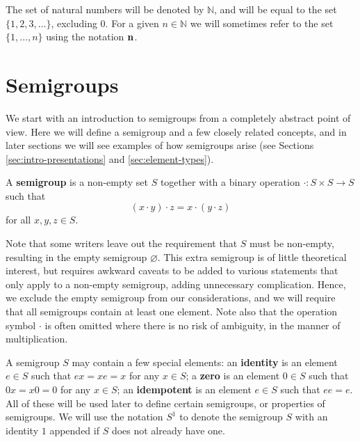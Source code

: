 The set of natural numbers will be denoted by $\mathbb{N}$, and will be equal to
the set $\{1, 2, 3, \ldots\}$, excluding $0$.  For a given $n \in \mathbb{N}$ we
will sometimes refer to the set $\{1, \ldots, n\}$ using the notation $\mathbf{n}$.

\section{Semigroups}
\label{sec:intro-semigroups}
We start with an introduction to semigroups from a completely abstract point of
view.  Here we will define a semigroup and a few closely related concepts, and
in later sections we will see examples of how semigroups arise (see Sections
\ref{sec:intro-presentations} and \ref{sec:element-types}).

\begin{definition}
  \label{def:semigroup}
  A \textbf{semigroup} is a non-empty set $S$ together with
  a binary operation $\cdot: S \times S \to S$ such that
  $$(x \cdot y) \cdot z = x \cdot (y \cdot z)$$
  for all $x, y, z \in S$.
\end{definition}
Note that some writers leave out the requirement that $S$ must be non-empty,
resulting in the empty semigroup $\varnothing$.  This extra semigroup is of
little theoretical interest, but requires awkward caveats to be added to various
statements that only apply to a non-empty semigroup, adding unnecessary
complication.  Hence, we exclude the empty semigroup from our considerations,
and we will require that all semigroups contain at least one element.  Note also
that the operation symbol $\cdot$ is often omitted where there is no risk of
ambiguity, in the manner of multiplication.

A semigroup $S$ may contain a few special elements: an \textbf{identity} is an
element $e \in S$ such that $ex = xe = x$ for any $x \in S$; a \textbf{zero} is
an element $0 \in S$ such that $0x = x0 = 0$ for any $x \in S$; an
\textbf{idempotent} is an element $e \in S$ such that $ee=e$.  All of these will
be used later to define certain semigroups, or properties of semigroups.  We
will use the notation $S^1$ to denote the semigroup $S$ with an identity $1$
appended if $S$ does not already have one.
  

